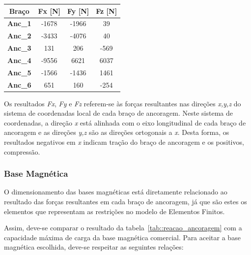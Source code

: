 \begin{center}
\centering
\begin{tabular}{|c|c|c|c|}
\hline
\textbf{Braço}  & \textbf{Fx {[}N{]}} & \textbf{Fy {[}N{]}} & \textbf{Fz {[}N{]}} \\ \hline
\textbf{Anc\_1} & -1678               & -1966               & 39                  \\ \hline
\textbf{Anc\_2} & -3433               & -4076               & 40                  \\ \hline
\textbf{Anc\_3} & 131                 & 206                 & -569                \\ \hline
\textbf{Anc\_4} & -9556               & 6621                & 6037                \\ \hline
\textbf{Anc\_5} & -1566               & -1436               & 1461                \\ \hline
\textbf{Anc\_6} & 651                 & 160                 & -254                \\ \hline
\end{tabular}
\label{tab::reacao_ancoragem}
\end{center}

Os resultados \textit{Fx}, \textit{Fy} e \textit{Fz} referem-se às forças
resultantes nas direções \textit{x,y,z} do sistema de coordenadas local de cada
braço de ancoragem. Neste sistema de coordenadas, a direção \textit{x} está
alinhada com o eixo longitudinal de cada braço de ancoragem e as direções
\textit{y,z} são as direções ortogonais a \textit{x}. 
Desta forma, os resultados negativos em \textit{x} indicam tração do
braço de ancoragem e os positivos, compressão.

\subsubsection{Base Magnética}

O dimensionamento das bases magnéticas está diretamente relacionado ao resultado
das forças resultantes em cada braço de ancoragem, já que são estes os elementos
que representam as restrições no modelo de Elementos Finitos.

Assim, deve-se comparar o resultado da tabela~\ref{tab::reacao_ancoragem} com a
capacidade máxima de carga da base magnética comercial. Para aceitar a base
magnética escolhida, deve-se respeitar as seguintes relações:

